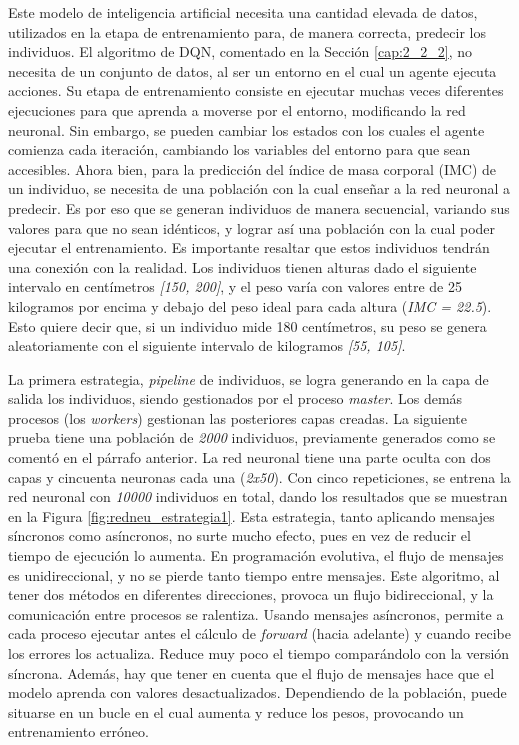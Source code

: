 Este modelo de inteligencia artificial necesita una cantidad elevada de datos, utilizados en la etapa de entrenamiento para, de manera correcta, predecir los individuos. El algoritmo de DQN, comentado en la Sección \ref{cap:2_2_2}, no necesita de un conjunto de datos, al ser un entorno en el cual un agente ejecuta acciones. Su etapa de entrenamiento consiste en ejecutar muchas veces diferentes ejecuciones para que aprenda a moverse por el entorno, modificando la red neuronal. Sin embargo, se pueden cambiar los estados con los cuales el agente comienza cada iteración, cambiando los variables del entorno para que sean accesibles. Ahora bien, para la predicción del índice de masa corporal (IMC) de un individuo, se necesita de una población con la cual enseñar a la red neuronal a predecir. Es por eso que se generan individuos de manera secuencial, variando sus valores para que no sean idénticos, y lograr así una población con la cual poder ejecutar el entrenamiento. Es importante resaltar que estos individuos tendrán una conexión con la realidad. Los individuos tienen alturas dado el siguiente intervalo en centímetros \textit{[150, 200]}, y el peso varía con valores entre de 25 kilogramos por encima y debajo del peso ideal para cada altura (\textit{IMC = 22.5}). Esto quiere decir que, si un individuo mide 180 centímetros, su peso se genera aleatoriamente con el siguiente intervalo de kilogramos \textit{[55, 105]}.


La primera estrategia, \textit{pipeline} de individuos, se logra generando en la capa de salida los individuos, siendo gestionados por el proceso \textit{master}. Los demás procesos (los \textit{workers}) gestionan las posteriores capas creadas. La siguiente prueba tiene una población de \textit{2000} individuos, previamente generados como se comentó en el párrafo anterior. La red neuronal tiene una parte oculta con dos capas y cincuenta neuronas cada una (\textit{2x50}). Con cinco repeticiones, se entrena la red neuronal con \textit{10000} individuos en total, dando los resultados que se muestran en la Figura \ref{fig:redneu_estrategia1}. Esta estrategia, tanto aplicando mensajes síncronos como asíncronos, no surte mucho efecto, pues en vez de reducir el tiempo de ejecución lo aumenta. En programación evolutiva, el flujo de mensajes es unidireccional, y no se pierde tanto tiempo entre mensajes. Este algoritmo, al tener dos métodos en diferentes direcciones, provoca un flujo bidireccional, y la comunicación entre procesos se ralentiza. Usando mensajes asíncronos, permite a cada proceso ejecutar antes el cálculo de \textit{forward} (hacia adelante) y cuando recibe los errores los actualiza. Reduce muy poco el tiempo comparándolo con la versión síncrona. Además, hay que tener en cuenta que el flujo de mensajes hace que el modelo aprenda con valores desactualizados. Dependiendo de la población, puede situarse en un bucle en el cual aumenta y reduce los pesos, provocando un entrenamiento erróneo.



